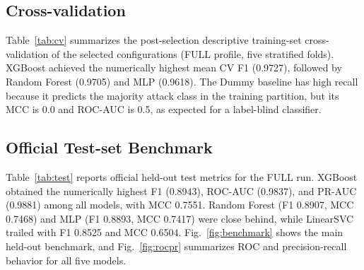\documentclass[conference]{IEEEtran}
\begin{document}
\subsection{Cross-validation}
Table~\ref{tab:cv} summarizes the post-selection descriptive training-set cross-validation of the selected configurations (FULL profile, five stratified folds). XGBoost achieved the numerically highest mean CV F1 (0.9727), followed by Random Forest (0.9705) and MLP (0.9618). The Dummy baseline has high recall because it predicts the majority attack class in the training partition, but its MCC is 0.0 and ROC-AUC is 0.5, as expected for a label-blind classifier.

\begin{table}[htbp]
\caption{Post-selection descriptive training-set cross-validation of selected configurations}
\label{tab:cv}
\centering
{}
\end{table}

\subsection{Official Test-set Benchmark}
Table~\ref{tab:test} reports official held-out test metrics for the FULL run. XGBoost obtained the numerically highest F1 (0.8943), ROC-AUC (0.9837), and PR-AUC (0.9881) among all models, with MCC 0.7551. Random Forest (F1 0.8907, MCC 0.7468) and MLP (F1 0.8893, MCC 0.7417) were close behind, while LinearSVC trailed with F1 0.8525 and MCC 0.6504. Fig.~\ref{fig:benchmark} shows the main held-out benchmark, and Fig.~\ref{fig:rocpr} summarizes ROC and precision-recall behavior for all five models.
\end{document}
